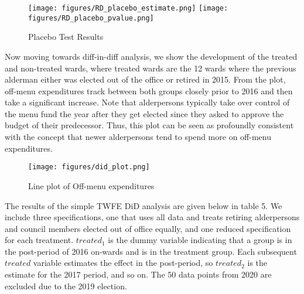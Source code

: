 \begin{figure}[H]
    \centering
    \texttt{[image: figures/RD\_placebo\_estimate.png]}
    \texttt{[image: figures/RD\_placebo\_pvalue.png]}
    \caption{Placebo Test Results}
\end{figure}

Now moving towards diff-in-diff analysis, we show the development of the treated and non-treated wards, where treated wards are the 12 wards where the previous alderman either was elected out of the office or retired in 2015. 
From the plot, off-menu expenditures track between both groups closely prior to 2016 and then take a significant increase. 
Note that alderpersons typically take over control of the menu fund the year after they get elected \cite{particpatory_budgeting_scrapping} since they asked to approve the budget of their predecessor. 
Thus, this plot can be seen as profoundly consistent with the concept that newer alderpersons tend to spend more on off-menu expenditures. 


\begin{figure}[H]
    \centering
    \texttt{[image: figures/did\_plot.png]}
    \caption{Line plot of Off-menu expenditures}
\end{figure}

The results of the simple TWFE DiD analysis are given below in table 5. 
We include three specifications, one that uses all data and treats retiring alderpersons and council members elected out of office equally, and one reduced specification for each treatment. 
$treated_1$ is the dummy variable indicating that a group is in the post-period of 2016 on-wards and is in the treatment group. 
Each subsequent $treated$ variable estimates the effect in the post-period, so $treated_2$ is the estimate for the 2017 period, and so on. 
The 50 data points from 2020 are excluded due to the 2019 election. 

